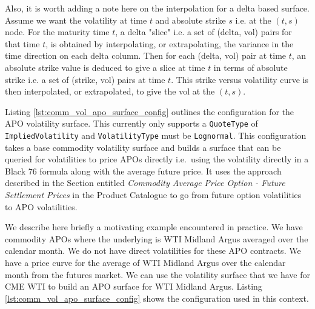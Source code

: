 Also, it is worth adding a note here on the interpolation for a delta based surface. Assume we want the volatility at time $t$ and absolute strike $s$ i.e. at the $(t, s)$ node. For the maturity time $t$, a delta "slice" i.e. a set of (delta, vol) pairs for that time $t$, is obtained by interpolating, or extrapolating, the variance in the time direction on each delta column. Then for each (delta, vol) pair at time $t$, an absolute strike value is deduced to give a slice at time $t$ in terms of absolute strike i.e. a set of (strike, vol) pairs at time $t$. This strike versus volatility curve is then interpolated, or extrapolated, to give the vol at the $(t, s)$.

Listing \ref{lst:comm_vol_apo_surface_config} outlines the configuration for the APO volatility surface. This currently only supports a \lstinline!QuoteType! of \lstinline!ImpliedVolatility! and \lstinline!VolatilityType! must be \lstinline!Lognormal!. This configuration takes a base commodity volatility surface and builds a surface that can be queried for volatilities to price APOs directly i.e.\ using the volatility directly in a Black 76 formula along with the average future price. It uses the approach described in the Section entitled \textit{Commodity Average Price Option - Future Settlement Prices} in the Product Catalogue to go from future option volatilities to APO volatilities.

We describe here briefly a motivating example encountered in practice. We have commodity APOs where the underlying is WTI Midland Argus averaged over the calendar month. We do not have direct volatilities for these APO contracts. We have a price curve for the average of WTI Midland Argus over the calendar month from the futures market. We can use the volatility surface that we have for CME WTI to build an APO surface for WTI Midland Argus. Listing \ref{lst:comm_vol_apo_surface_config} shows the configuration used in this context.

